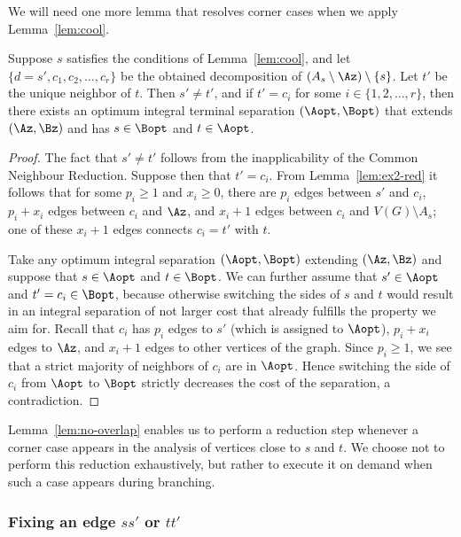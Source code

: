 We will need one more lemma that resolves corner cases when we apply Lemma~\ref{lem:cool}.

\begin{lemma}\label{lem:no-overlap}
Suppose $s$ satisfies the conditions of Lemma~\ref{lem:cool}, and let $\{d=s',c_1,c_2,\ldots,c_r\}$ be the obtained decomposition of $(A_s\setminus \Az)\setminus \{s\}$. Let $t'$ be the unique neighbor of $t$. Then $s'\neq t'$, and if $t'=c_i$ for some $i\in \{1,2,\ldots,r\}$, then there exists an optimum integral terminal separation $(\Aopt,\Bopt)$ that extends $(\Az,\Bz)$ and has $s\in \Bopt$ and $t\in \Aopt$.
\end{lemma}
\begin{proof}
The fact that $s'\neq t'$ follows from the inapplicability of the Common Neighbour Reduction. Suppose then that $t'=c_i$. From Lemma~\ref{lem:ex2-red} it follows that for some $p_i\geq 1$ and $x_i\geq 0$, there are $p_i$ edges between $s'$ and $c_i$, $p_i+x_i$ edges between $c_i$ and $\Az$, and $x_i+1$ edges between $c_i$ and $V(G)\setminus A_s$; one of these $x_i+1$ edges connects $c_i=t'$ with $t$.

Take any optimum integral separation $(\Aopt,\Bopt)$ extending $(\Az,\Bz)$ and suppose that $s\in \Aopt$ and $t\in \Bopt$. We can further assume that $s'\in \Aopt$ and $t'=c_i\in \Bopt$, because otherwise switching the sides of $s$ and $t$ would result in an integral separation of not larger cost that already fulfills the property we aim for. Recall that $c_i$ has $p_i$ edges to $s'$ (which is assigned to $\Aopt$), $p_i+x_i$ edges to $\Az$, and $x_i+1$ edges to other vertices of the graph. Since $p_i\geq 1$, we see that a strict majority of neighbors of $c_i$ are in $\Aopt$. Hence switching the side of $c_i$ from $\Aopt$ to $\Bopt$ strictly decreases the cost of the separation, a contradiction.
\end{proof}

Lemma~\ref{lem:no-overlap} enables us to perform a reduction step whenever a corner case appears in the analysis of vertices close to $s$ and $t$. We choose not to perform this reduction exhaustively, but rather to execute it on demand when such a case appears during branching.



\subsubsection{Fixing an edge $ss'$ or $tt'$}

